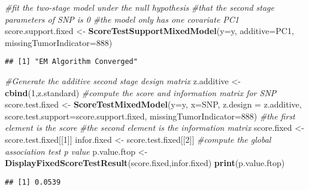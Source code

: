 \documentclass[11pt,]{article}
\newenvironment{Shaded}{\begin{snugshade}}{\end{snugshade}}
\newcommand{\KeywordTok}[1]{\textcolor[rgb]{0.13,0.29,0.53}{\textbf{#1}}}
\newcommand{\DataTypeTok}[1]{\textcolor[rgb]{0.13,0.29,0.53}{#1}}
\newcommand{\DecValTok}[1]{\textcolor[rgb]{0.00,0.00,0.81}{#1}}
\newcommand{\StringTok}[1]{\textcolor[rgb]{0.31,0.60,0.02}{#1}}
\newcommand{\CommentTok}[1]{\textcolor[rgb]{0.56,0.35,0.01}{\textit{#1}}}
\newcommand{\NormalTok}[1]{#1}
\begin{document}
\begin{Shaded}
\begin{Highlighting}[]
\CommentTok{#fit the two-stage model under the null hypothesis}
\CommentTok{#that the second stage parameters of SNP is 0}
\CommentTok{#the model only has one covariate PC1}
\NormalTok{score.support.fixed <-}\StringTok{ }\KeywordTok{ScoreTestSupportMixedModel}\NormalTok{(}\DataTypeTok{y=}\NormalTok{y,}
                                                  \DataTypeTok{additive=}\NormalTok{PC1,}
                                                  \DataTypeTok{missingTumorIndicator=}\DecValTok{888}\NormalTok{)}
\end{Highlighting}
\end{Shaded}

\begin{verbatim}
## [1] "EM Algorithm Converged"
\end{verbatim}

\begin{Shaded}
\begin{Highlighting}[]
\CommentTok{#Generate the additive second stage design matrix}
\NormalTok{z.additive <-}\StringTok{ }\KeywordTok{cbind}\NormalTok{(}\DecValTok{1}\NormalTok{,z.standard)}
\CommentTok{#compute the score and information matrix for SNP}
\NormalTok{score.test.fixed <-}\StringTok{ }\KeywordTok{ScoreTestMixedModel}\NormalTok{(}\DataTypeTok{y=}\NormalTok{y,}
                                        \DataTypeTok{x=}\NormalTok{SNP,}
                                        \DataTypeTok{z.design =}\NormalTok{ z.additive,}
                                        \DataTypeTok{score.test.support=}\NormalTok{score.support.fixed,}
                                        \DataTypeTok{missingTumorIndicator=}\DecValTok{888}\NormalTok{)}
\CommentTok{#the first element is the score}
\CommentTok{#the second element is the information matrix}
\NormalTok{score.fixed <-}\StringTok{ }\NormalTok{score.test.fixed[[}\DecValTok{1}\NormalTok{]]}
\NormalTok{infor.fixed <-}\StringTok{ }\NormalTok{score.test.fixed[[}\DecValTok{2}\NormalTok{]]}
\CommentTok{#compute the global association test p value}
\NormalTok{p.value.ftop <-}\StringTok{ }\KeywordTok{DisplayFixedScoreTestResult}\NormalTok{(score.fixed,infor.fixed) }
\KeywordTok{print}\NormalTok{(p.value.ftop)}
\end{Highlighting}
\end{Shaded}

\begin{verbatim}
## [1] 0.0539
\end{verbatim}
\end{document}
